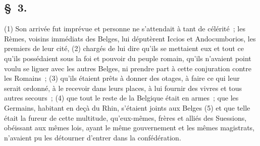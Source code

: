 \documentclass[french,twoside]{book} %
\begin{document}
\subsection[{§ 3.}]{ \textsc{§ 3.} }
\noindent (1) Son arrivée fut imprévue et personne ne s’attendait à tant de célérité ; les Rèmes, voisins immédiats des Belges, lui députèrent Iccios et Andocumborios, les premiers de leur cité, (2) chargés de lui dire qu’ils se mettaient eux et tout ce qu’ils possédaient sous la foi et pouvoir du peuple romain, qu’ils n’avaient point voulu se liguer avec les autres Belges, ni prendre part à cette conjuration contre les Romains ; (3) qu’ils étaient prêts à donner des otages, à faire ce qui leur serait ordonné, à le recevoir dans leurs places, à lui fournir des vivres et tous autres secours ; (4) que tout le reste de la Belgique était en armes ; que les Germains, habitant en deçà du Rhin, s’étaient joints aux Belges (5) et que telle était la fureur de cette multitude, qu’eux-mêmes, frères et alliés des Suessions, obéissant aux mêmes lois, ayant le même gouvernement et les mêmes magistrats, n’avaient pu les détourner d’entrer dans la confédération.
\end{document}
